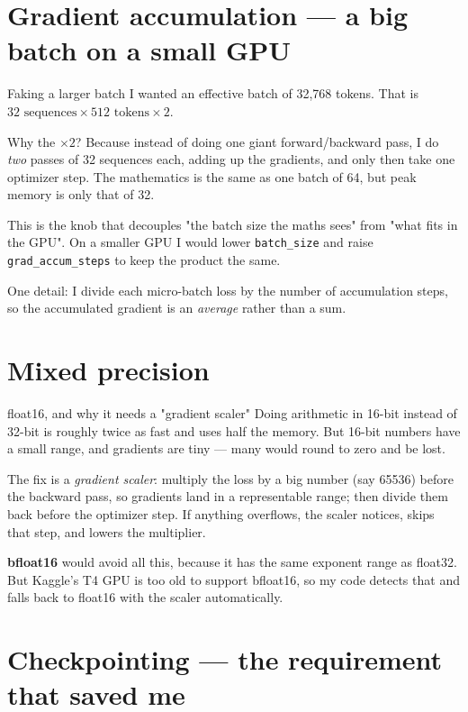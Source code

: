 \documentclass[11pt]{report}
\newcommand{\p}[1]{\texttt{#1}}
\begin{document}
\section{Gradient accumulation --- a big batch on a small GPU}

\begin{concept}{Faking a larger batch}
I wanted an effective batch of 32,768 tokens. That is
$32 \text{ sequences} \times 512 \text{ tokens} \times 2$.

Why the $\times 2$? Because instead of doing one giant forward/backward pass, I do
\emph{two} passes of 32 sequences each, adding up the gradients, and only then take
one optimizer step. The mathematics is the same as one batch of 64, but peak
memory is only that of 32.

This is the knob that decouples "the batch size the maths sees" from "what fits in
the GPU". On a smaller GPU I would lower \p{batch\_size} and raise
\p{grad\_accum\_steps} to keep the product the same.

One detail: I divide each micro-batch loss by the number of accumulation steps, so
the accumulated gradient is an \emph{average} rather than a sum.
\end{concept}

\section{Mixed precision}

\begin{concept}{float16, and why it needs a "gradient scaler"}
Doing arithmetic in 16-bit instead of 32-bit is roughly twice as fast and uses
half the memory. But 16-bit numbers have a small range, and gradients are tiny ---
many would round to zero and be lost.

The fix is a \emph{gradient scaler}: multiply the loss by a big number (say 65536)
before the backward pass, so gradients land in a representable range; then divide
them back before the optimizer step. If anything overflows, the scaler notices,
skips that step, and lowers the multiplier.

\textbf{bfloat16} would avoid all this, because it has the same exponent range as
float32. But Kaggle's T4 GPU is too old to support bfloat16, so my code detects
that and falls back to float16 with the scaler automatically.
\end{concept}

\section{Checkpointing --- the requirement that saved me}
\end{document}

